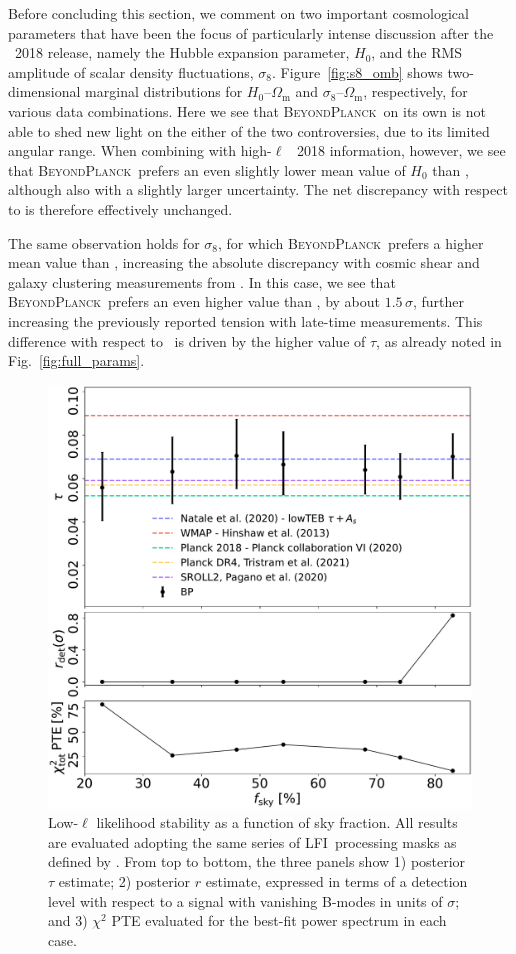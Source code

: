 \documentclass[onecolumn]{aa}
\newcommand{\BP}{\textsc{BeyondPlanck}}
\newcommand{\lfi}[0]{LFI}
\begin{document}
Before concluding this section, we comment on two important
cosmological parameters that have been the focus of particularly
intense discussion after the \Planck\ 2018 release, namely the Hubble
expansion parameter, $H_0$, and the RMS amplitude of scalar density
fluctuations, $\sigma_8$. Figure~\ref{fig:s8_omb} shows
two-dimensional marginal distributions for $H_0$--$\Omega_\mathrm{m}$
and $\sigma_8$--$\Omega_\mathrm{m}$, respectively, for various data
combinations. Here we see that \BP\ on its own is not able to shed new
light on the either of the two controversies, due to its limited
angular range. When combining with high-$\ell$ \Planck\ 2018
information, however, we see that \BP\ prefers an even slightly lower
mean value of $H_0$ than , although also with a slightly larger
uncertainty. The net discrepancy with respect to \citet{Riess2018a} is
therefore effectively unchanged.

The same observation holds for $\sigma_8$, for which \BP\ prefers a
higher mean value than \Planck, increasing the absolute discrepancy
with cosmic shear and galaxy clustering measurements from
\citet{KiDS2021}. In this case, we see that \BP\ prefers an even
higher value than \Planck, by about $1.5\,\sigma$, further increasing
the previously reported tension with late-time measurements. This
difference with respect to \Planck\ is driven by the higher value of
$\tau$, as already noted in Fig.~\ref{fig:full_params}.

\begin{figure}[t]
	\center
	\includegraphics[width=0.7\linewidth]{figs/lowl_fsky_tau_r_PTE_BI200_regP05.pdf}
  	\caption{Low-$\ell$ likelihood stability as a function of sky
          fraction. All results are evaluated adopting the same series
          of \lfi\ processing masks as defined by
          \citep{planck2016-l05}. From top to bottom, the three panels
          show 1) posterior $\tau$ estimate; 2) posterior $r$
          estimate, expressed in terms of a detection level with
          respect to a signal with vanishing B-modes in units of
          $\sigma$; and 3) $\chi^2$ PTE evaluated for the best-fit
          power spectrum in each case.}
	\label{fig:lowl_fsky}
\end{figure}
\end{document}
